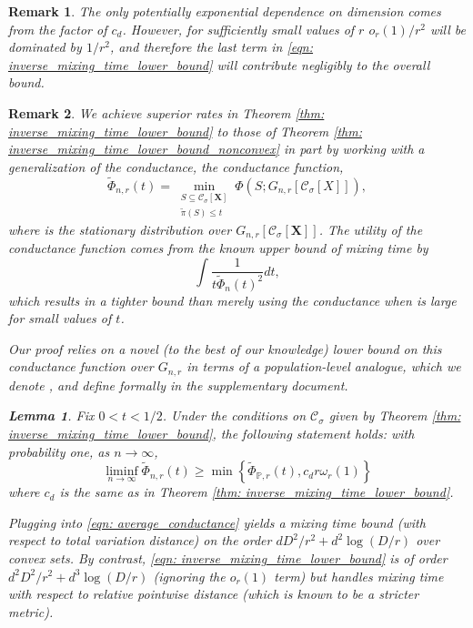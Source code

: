 \documentclass{article}
\newcommand{\1}{\mathbf{1}}
\newcommand{\Xbf}{\mathbf{X}}
\newcommand{\Pbb}{\mathbb{P}}
\newcommand{\Cset}{\mathcal{C}}
\newcommand{\Csig}{\Cset_{\sigma}}
\theoremstyle{aldenthm}
\newtheorem{lemma}{Lemma}
\theoremstyle{aldenrmrk}
\newtheorem{remark}{Remark}
\begin{document}
\begin{remark}
The only potentially exponential dependence on dimension comes from the
factor of $c_d$. However, for sufficiently small values of $r$ $o_r(1)/r^2$ will be dominated by $1/r^2$, and therefore the last term in \eqref{eqn: inverse_mixing_time_lower_bound} will contribute negligibly to the overall bound.
\end{remark}
\begin{remark}
We achieve superior rates in Theorem \ref{thm: inverse_mixing_time_lower_bound}
to those of Theorem \ref{thm: inverse_mixing_time_lower_bound_nonconvex} in part 
by working with a generalization of the conductance, the \emph{conductance
  function},
$$
\widetilde{\Phi}_{n,r}(t) = 
\min_{\substack{S \subseteq \Csig[\Xbf] \\ \widetilde\pi(S) \leq t}} 
\Phi(S; G_{n,r}[\Csig[X]]),
$$
where \smash{$\widetilde\pi$} is the stationary distribution over
$G_{n,r}[\Csig[\Xbf]]$. The utility of the conductance function comes from the
known upper bound of mixing time by  
\begin{equation}
\label{eqn: average_conductance}
\int \frac{1}{t \widetilde{\Phi}_n(t)^2} dt,
\end{equation}
which results in a tighter bound than merely using the conductance when
 is large for small values of $t$. 
 
Our proof relies on a novel (to the best of our knowledge) lower bound
on this conductance function over $G_{n,r}$ in terms of a population-level
analogue, which we denote \smash{$\widetilde{\Phi}_{\Pbb,r}$}, and define formally in the supplementary document.
\begin{lemma}
	\label{lem: consistency_of_conductance_function_main}
	Fix $0 < t < 1/2$. Under the conditions on $\Csig$ given by Theorem \ref{thm: inverse_mixing_time_lower_bound}, the following statement holds: with probability one, as $n \to \infty$,
	\begin{equation}
	\label{eqn: pointwise_consistency_of_conductance_function}
	\liminf_{n \to \infty} \widetilde{\Phi}_{n,r}(t) \geq \min\left\{\widetilde{\Phi}_{\Pbb,r}(t), c_d r \omega_r(1)\right\}
	\end{equation}
	where $c_d$ is the same as in Theorem \ref{thm: inverse_mixing_time_lower_bound}.
\end{lemma}
Plugging
\smash{$\widetilde{\Phi}_{\Pbb,r}$} into \eqref{eqn: average_conductance} yields
a mixing time bound (with respect to total variation distance) on the order $d 
D^2/r^2 + d^2\log(D/r)$ over convex sets. By contrast, \eqref{eqn:
  inverse_mixing_time_lower_bound} is of order $d^2 D^2/r^2 + d^3\log(D/r)$ 
(ignoring the $o_r(1)$ term) but handles mixing time with respect to relative
pointwise distance (which is known to be a stricter metric). 
\end{remark}
\end{document}
